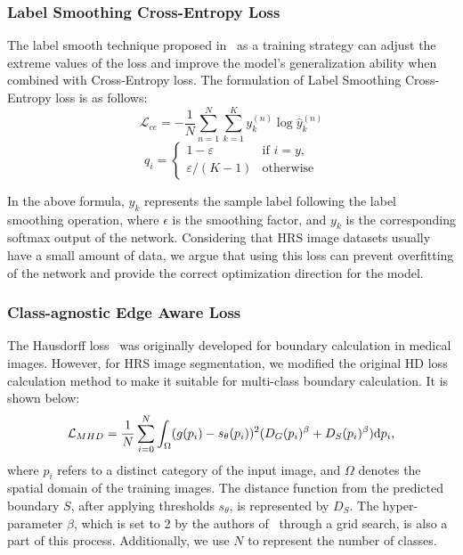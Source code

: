 \documentclass[journal]{IEEEtran}
\begin{document}
\subsubsection{Label Smoothing Cross-Entropy Loss}
The label smooth technique proposed in~\cite{muller2019does} as a training strategy can adjust the extreme values of the loss and improve the model's generalization ability when combined with Cross-Entropy loss. The formulation of Label Smoothing Cross-Entropy loss is as follows:
\begin{equation}
\mathcal{L}_{ce} = -\frac{1}{N}\sum_{n=1}^N\sum_{k=1}^Ky_k^{(n)}\log\hat{y}_k^{(n)}
\end{equation}
\begin{equation}
q_i=
\begin{cases}
1 - \varepsilon& \text{if } i = y,\\
\varepsilon/(K - 1)& \text{otherwise}
\end{cases}
\end{equation}

In the above formula, $y_{k}$ represents the sample label following the label smoothing operation, where $\epsilon$ is the smoothing factor, and $y_{k}$ is the corresponding softmax output of the network. Considering that HRS image datasets usually have a small amount of data, we argue that using this loss can prevent overfitting of the network and provide the correct optimization direction for the model.

\subsubsection{Class-agnostic Edge Aware Loss}
The Hausdorff loss~\cite{karimi2019reducing} was originally developed for boundary calculation in medical images. However, for HRS image segmentation, we modified the original HD loss calculation method to make it suitable for multi-class boundary calculation. It is shown below:
\begin{equation}
\small
    \mathcal{L}_{MHD} = \frac{1}{N}\sum_{i=0}^{N}\int_{\Omega}(g(p_{i}) - s_{\theta}(p_{i}))^2(D_{G}(p_{i})^\beta + D_{S}(p_{i})^\beta)\mathrm{d}p_{i},
\label{eq:l_hd}
\end{equation}
where $p_{i}$ refers to a distinct category of the input image, and $\Omega$ denotes the spatial domain of the training images. The distance function from the predicted boundary $S$, after applying thresholds $s_{\theta}$, is represented by $D_{S}$. The hyper-parameter $\beta$, which is set to 2 by the authors of~\cite{karimi2019reducing} through a grid search, is also a part of this process. Additionally, we use $N$ to represent the number of classes.
\end{document}
